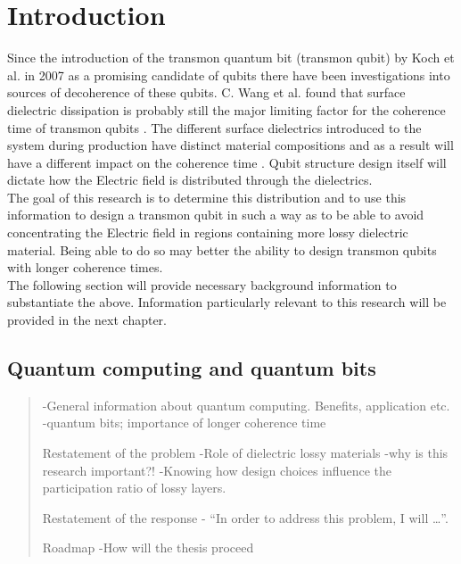 \chapter{Introduction}
Since the introduction of the transmon quantum bit (transmon qubit) by Koch et al. in 2007 \cite{Koch2007} as a promising candidate of qubits there have been investigations into sources of decoherence of these qubits. C. Wang et al. found that surface dielectric dissipation is probably still the major limiting factor for the coherence time of transmon qubits \cite{Wang2015}. The different surface dielectrics introduced to the system during production have distinct material compositions \cite{Bruno2015} and as a result will have a different impact on the coherence time \cite{Wang2015}. Qubit structure design itself will dictate how the Electric field is distributed through the dielectrics. \\The goal of this research is to determine this distribution and to use this information to design a transmon qubit in such a way as to be able to avoid concentrating the Electric field in regions containing more lossy dielectric material. Being able to do so may better the ability to design transmon qubits with longer coherence times. \\ The following section will provide necessary background information to substantiate the above. Information particularly relevant to this research will be provided in the next chapter.

\section{Quantum computing and quantum bits}
\begin{quote}
	-General information about quantum computing. Benefits, application etc.
	-quantum bits; importance of longer coherence time
	
	Restatement of the problem
	-Role of dielectric lossy materials
	-why is this research important?!
	-Knowing how design choices influence the participation ratio of lossy layers.
	
	Restatement of the response
	- “In order to address this problem, I will …”.
	
	Roadmap
	-How will the thesis proceed
\end{quote}


